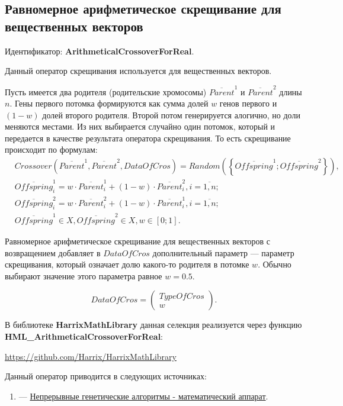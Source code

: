 \subsection{Равномерное арифметическое скрещивание для вещественных векторов}\label{SetOfOperatorsAlgorithms:ArithmeticalCrossoverForReal}

Идентификатор: \textbf{ArithmeticalCrossoverForReal}.

Данный оператор скрещивания используется для вещественных векторов.

Пусть имеется два родителя (родительские хромосомы) $ \overline{Parent}^1 $ и $ \overline{Parent}^2$ длины $n$. Гены первого потомка формируются как сумма долей $w$ генов первого и $ \left( 1-w\right) $ долей второго родителя. Второй потом генерируется алогично, но доли меняются местами.  Из них выбирается случайно один потомок, который и передается в качестве результата оператора скрещивания. То есть скрещивание происходит по формулам:
\begin{align}
\label{SetOfOperatorsAlgorithms:eq:ArithmeticalCrossoverForReal}
&Crossover \left( \overline{Parent}^1, \overline{Parent}^2, DataOfCros\right)=Random \left(\left\lbrace \overline{Offspring}^1; \overline{Offspring}^2\right\rbrace  \right), \\
& \overline{Offspring}^1_i=w\cdot\overline{Parent}^1_i+\left( 1-w\right)\cdot\overline{Parent}^2_i , i=\overline{1,n};\nonumber\\
&\overline{Offspring}^2_i=w\cdot\overline{Parent}^2_i+\left( 1-w\right)\cdot\overline{Parent}^1_i , i=\overline{1,n};\nonumber\\
&\overline{Offspring}^1\in X, \overline{Offspring}^2\in X, w\in \left[ 0; 1\right] .\nonumber
\end{align}

Равномерное арифметическое скрещивание для вещественных векторов с возвращением добавляет в $ DataOfCros $ дополнительный параметр --- параметр скрещивания, который означает долю какого-то родителя в потомке $ w $. Обычно выбирают значение этого параметра равное $ w=0.5 $.

\begin{equation}
DataOfCros=\left( \begin{array}{c} TypeOfCros \\ w \end{array} \right).
\end{equation}

В библиотеке \textbf{HarrixMathLibrary} данная селекция реализуется через функцию \textbf{HML\_ArithmeticalCrossoverForReal}:

\href{https://github.com/Harrix/HarrixMathLibrary}{https://github.com/Harrix/HarrixMathLibrary}

Данный оператор приводится в следующих источниках:

\begin{enumerate}
\item \cite{web:basegroup.ru:real_coded_ga} ---  \href{http://www.basegroup.ru/library/optimization/real_coded_ga/}{Непрерывные генетические алгоритмы - математический аппарат}.
\end{enumerate}